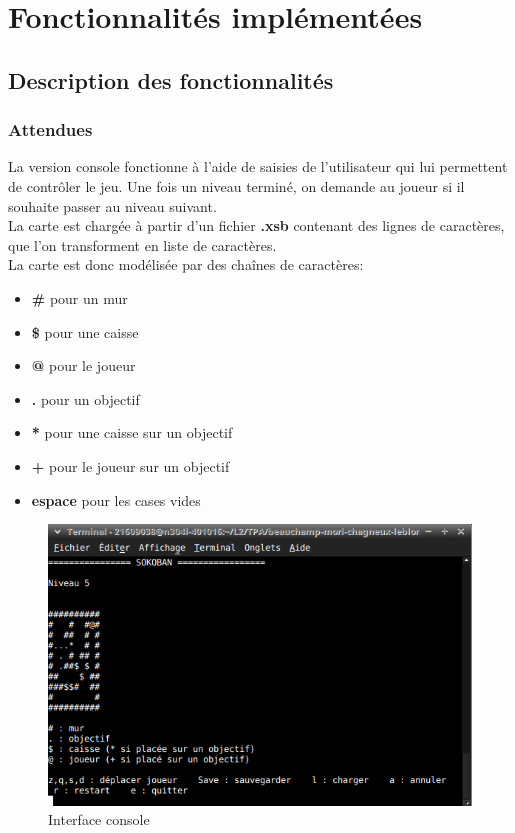 \documentclass[a4paper,12pt]{article} %
\begin{document}
\section{Fonctionnalités implémentées}

\subsection{Description des fonctionnalités}

\subsubsection*{Attendues}

La version console fonctionne à l'aide de saisies de l'utilisateur qui lui permettent de contrôler le jeu. Une fois un niveau terminé, on demande au joueur si il souhaite passer au niveau suivant.\\

La carte est chargée à partir d'un fichier \textbf{.xsb} contenant des lignes de caractères, que l'on transforment en liste de caractères.\\
La carte est donc modélisée par des chaînes de caractères:
\begin{itemize}
\item \textbf{\#} pour un mur
\item \textbf{\$} pour une caisse
\item \textbf{@} pour le joueur
\item \textbf{.} pour un objectif
\item \textbf{*} pour une caisse sur un objectif
\item \textbf{+} pour le joueur sur un objectif
\item \textbf{espace} pour les cases vides
\end{itemize}

\begin{figure}[!h]
\centering
\includegraphics[scale=0.5]{images/Capture.png}
\caption{Interface console}
\end{figure}
\end{document}
